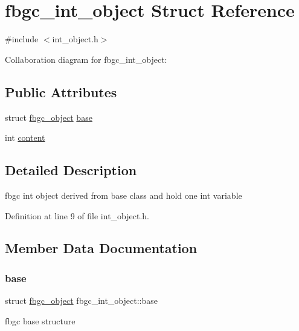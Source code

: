 \hypertarget{structfbgc__int__object}{}\section{fbgc\+\_\+int\+\_\+object Struct Reference}
\label{structfbgc__int__object}


{\ttfamily \#include $<$int\+\_\+object.\+h$>$}



Collaboration diagram for fbgc\+\_\+int\+\_\+object\+:
\subsection*{Public Attributes}
\begin{DoxyCompactItemize}
\item 
struct \hyperlink{structfbgc__object}{fbgc\+\_\+object} \hyperlink{structfbgc__int__object_aba52fa6e762fef775585cc1288157d11}{base}
\item 
int \hyperlink{structfbgc__int__object_a79d3de9dbff05bbda39e3a5a7440151e}{content}
\end{DoxyCompactItemize}


\subsection{Detailed Description}
fbgc int object derived from base class and hold one int variable 

Definition at line 9 of file int\+\_\+object.\+h.



\subsection{Member Data Documentation}
\mbox{\label{structfbgc__int__object_aba52fa6e762fef775585cc1288157d11}} 
\subsubsection{\texorpdfstring{base}{base}}
{\footnotesize\ttfamily struct \hyperlink{structfbgc__object}{fbgc\+\_\+object} fbgc\+\_\+int\+\_\+object\+::base}

fbgc base structure 

